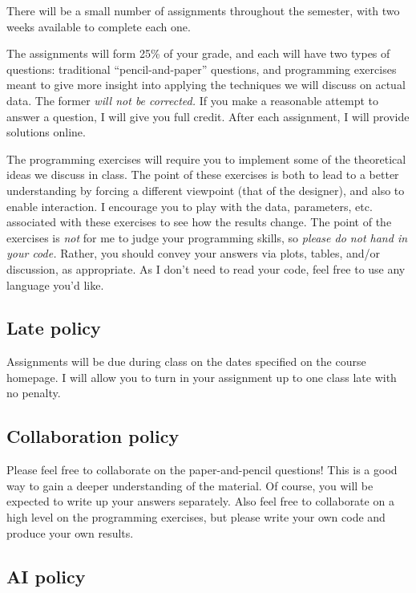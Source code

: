 \documentclass{article}
\begin{document}
There will be a small number of assignments throughout the semester, with two
weeks available to complete each one.

The assignments will form 25\% of your grade, and each will have two types of
questions: traditional ``pencil-and-paper'' questions, and programming exercises
meant to give more insight into applying the techniques we will discuss on
actual data.  The former \emph{will not be corrected.}  If you make a reasonable
attempt to answer a question, I will give you full credit.  After each
assignment, I will provide solutions online.

The programming exercises will require you to implement some of the theoretical
ideas we discuss in class.  The point of these exercises is both to lead to a
better understanding by forcing a different viewpoint (that of the designer),
and also to enable interaction.  I encourage you to play with the data,
parameters, etc. associated with these exercises to see how the results change.
The point of the exercises is \emph{not} for me to judge your programming
skills, so \emph{please do not hand in your code.}  Rather, you should convey
your answers via plots, tables, and/or discussion, as appropriate.  As I don't
need to read your code, feel free to use any language you'd like.

\subsection*{Late policy}

Assignments will be due during class on the dates specified on the course
homepage.  I will allow you to turn in your assignment up to one class late with
no penalty.

\subsection*{Collaboration policy}

Please feel free to collaborate on the paper-and-pencil questions!  This is a
good way to gain a deeper understanding of the material.  Of course, you will be
expected to write up your answers separately.  Also feel free to collaborate on
a high level on the programming exercises, but please write your own code and
produce your own results.

\subsection*{AI policy}
\end{document}
